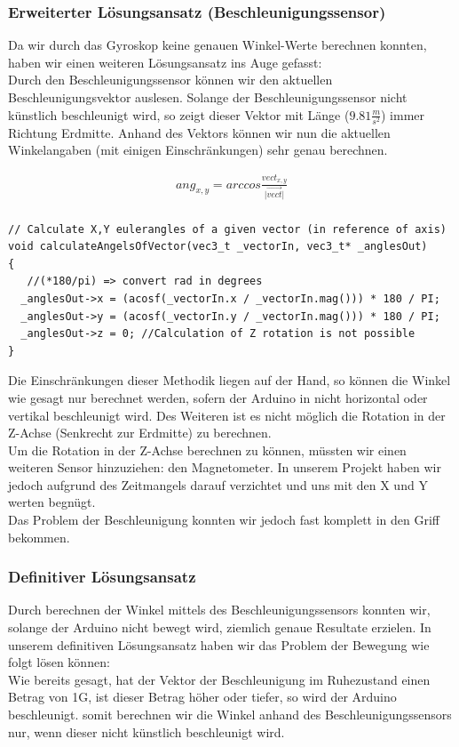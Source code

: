\subsubsection{Erweiterter Lösungsansatz (Beschleunigungssensor)}
Da wir durch das Gyroskop keine genauen Winkel-Werte berechnen konnten, haben wir einen weiteren Lösungsansatz ins Auge gefasst:\\
Durch den Beschleunigungssensor können wir den aktuellen Beschleunigungsvektor auslesen. Solange der Beschleunigungssensor nicht künstlich beschleunigt wird, 
so zeigt dieser Vektor mit Länge (\begin{math}9.81\frac{m}{s^2}\end{math}) immer Richtung Erdmitte. Anhand des Vektors können wir nun die aktuellen Winkelangaben (mit einigen Einschränkungen) sehr genau berechnen.

\begin{gather*}
ang_{x,y} = arccos{\frac{vect_{x,y}}{\lvert\overrightarrow{vect}\rvert}}\\
\end{gather*}  

\begin{lstlisting}
// Calculate X,Y eulerangles of a given vector (in reference of axis)
void calculateAngelsOfVector(vec3_t _vectorIn, vec3_t* _anglesOut)
{
   //(*180/pi) => convert rad in degrees
  _anglesOut->x = (acosf(_vectorIn.x / _vectorIn.mag())) * 180 / PI; 
  _anglesOut->y = (acosf(_vectorIn.y / _vectorIn.mag())) * 180 / PI;
  _anglesOut->z = 0; //Calculation of Z rotation is not possible 
}
\end{lstlisting}

Die Einschränkungen dieser Methodik liegen auf der Hand, so können die Winkel wie gesagt nur berechnet werden, sofern der Arduino in nicht horizontal oder vertikal beschleunigt wird.
Des Weiteren ist es nicht möglich die Rotation in der Z-Achse (Senkrecht zur Erdmitte) zu berechnen.\\
Um die Rotation in der Z-Achse berechnen zu können, müssten wir einen weiteren Sensor hinzuziehen: den Magnetometer. 
In unserem Projekt haben wir jedoch aufgrund des Zeitmangels darauf verzichtet und uns mit den X und Y werten begnügt.\\
Das Problem der Beschleunigung konnten wir jedoch fast komplett in den Griff bekommen.

\newpage
\subsubsection{Definitiver Lösungsansatz}
Durch berechnen der Winkel mittels des Beschleunigungssensors konnten wir, solange der Arduino nicht bewegt wird, ziemlich genaue Resultate erzielen.
In unserem definitiven Lösungsansatz haben wir das Problem der Bewegung wie folgt lösen können:\\
Wie bereits gesagt, hat der Vektor der Beschleunigung im Ruhezustand einen Betrag von 1G, ist dieser Betrag höher oder tiefer, so wird der Arduino beschleunigt.
somit berechnen wir die Winkel anhand des Beschleunigungssensors nur, wenn dieser nicht künstlich beschleunigt wird.

